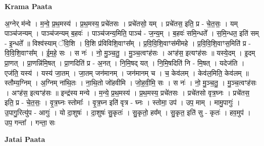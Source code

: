 \documentclass[17pt]{extarticle}
\begin{document}
\textbf{Krama Paata} \newline

अ॒ग्नेर् म॑न्वे । म॒न्वे॒ प्र॒थ॒मस्य॑ । प्र॒थ॒मस्य॒ प्रचे॑तसः । प्रचे॑तसो॒ यम् । प्रचे॑तस॒ इति॒ प्र - चे॒त॒सः॒ । यम् पाञ्च॑जन्यम् । पाञ्च॑जन्यम् ब॒हवः॑ । पाञ्च॑जन्य॒मिति॒ पाञ्च॑ - ज॒न्य॒॒म् । ब॒हवः॑ समि॒न्धते᳚ । स॒मि॒न्धत॒ इति॑ सम् - इ॒न्धते᳚ ॥ विश्व॑स्याम् ॅवि॒शि । वि॒शि प्र॑विविशि॒वाꣳस᳚म् । प्र॒वि॒वि॒शि॒वाꣳस॑मीमहे । प्र॒वि॒वि॒शि॒वाꣳस॒मिति॑ प्र - वि॒वि॒शि॒वाꣳस᳚म् । ई॒म॒हे॒ सः । स नः॑ । नो॒ मु॒ञ्च॒तु॒ । मु॒ञ्च॒त्वꣳह॑सः । अꣳह॑स॒ इत्यꣳह॑सः ॥ यस्ये॒दम् । इ॒दम् प्रा॒णत् । प्रा॒णन्नि॑मि॒षत् । प्रा॒णदिति॑ प्र - अ॒नत् । नि॒मि॒षद् यत् । नि॒मि॒षदिति॑ नि - मि॒षत् । यदेज॑ति । एज॑ति॒ यस्य॑ । यस्य॑ जा॒तम् । जा॒तम् जन॑मानम् । जन॑मानम् च । च॒ केव॑लम् । केव॑ल॒मिति॒ केव॑लम् ॥ स्तौम्य॒ग्निम् । अ॒ग्निम् ना॑थि॒तः । ना॒थि॒तो जो॑हवीमि । जो॒ह॒वी॒मि॒ सः । स नः॑ । नो॒ मु॒ञ्च॒तु॒ । मु॒ञ्च॒त्वꣳह॑सः । अꣳह॑स॒ इत्यꣳह॑सः ॥ इन्द्र॑स्य मन्ये । म॒न्ये॒ प्र॒थ॒मस्य॑ । प्र॒थ॒मस्य॒ प्रचे॑तसः । प्रचे॑तसो वृत्र॒घ्नः । प्रचे॑तस॒ इति॒ प्र - चे॒त॒सः॒ । वृ॒त्र॒घ्नः स्तोमाः᳚ । वृ॒त्र॒घ्न इति॑ वृत्र - घ्नः । स्तोमा॒ उप॑ । उप॒ माम् । मामु॒पागुः॑ । उ॒पागु॒रित्यु॑प - आगुः॑ । यो दा॒शुषः॑ । दा॒शुषः॑ सु॒कृतः॑ । सु॒कृतो॒ हव᳚म् । सु॒कृत॒ इति॑ सु - कृतः॑ । हव॒मुप॑ । उप॒ गन्ता᳚ । गन्ता॒ सः \newline

\textbf{Jatai Paata} \newline
\end{document}
